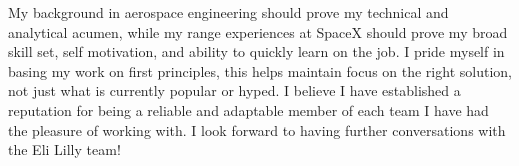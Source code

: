 \begin{cvletter}

My background in aerospace engineering should prove my technical and analytical acumen, while my
range experiences at SpaceX should prove my broad skill set, self motivation, and ability to quickly
learn on the job. I pride myself in basing my work on first principles, this helps maintain focus on
the right solution, not just what is currently popular or hyped. I believe I have established a
reputation for being a reliable and adaptable member of each team I have had the pleasure of
working with. I look forward to having further conversations with the Eli Lilly team!


\end{cvletter}

